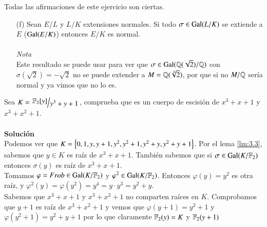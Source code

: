 \begin{ex}[H3.10]
    Todas las afirmaciones de este ejercicio son ciertas.
    \begin{itemize}
        \item[(f)] Sean $E/L$ y $L/K$ extensiones normales. Si todo $\sigma \in \mathrm{Gal}(L/K)$ se extiende a $E$ ($\mathrm{Gal}(E/K)$) entonces $E/K$ es normal.\\\\
        \textit{Nota}\\
        Este resultado se puede usar para ver que $\sigma \in \mathrm{Gal}(\mathbb{Q}(\sqrt 2)/\mathbb{Q})$ con $\sigma(\sqrt 2) = -\sqrt 2$ no se puede extender a $M = \mathbb{Q}(\sqrt[4]{2})$, por que si no $M/\mathbb{Q}$ sería normal y ya vimos que no lo es.
    \end{itemize}
\end{ex}

\begin{ex}[H3.4]
    Sea $K = \quo{\F_2[y]}{y^3 + y + 1}$, comprueba que es un cuerpo de escisión de $x^3 + x + 1$ y $x^3 + x^2 + 1$.\\\\
    \textbf{Solución}\\
    Podemos ver que $K = \left\{0, 1, y, y+1, y^2, y^2+1, y^2+y, y^2+y+1\right\}$. Por el lema \ref{lm:3.3}, sabemos que $y \in K$ es raíz de $x^3+x+1$. También sabemos que si $\sigma \in \mathrm{Gal}(K/\mathbb{F}_2)$ entonces $\sigma(y)$ es raíz de $x^3+x+1$.\\
    Tomamos $\varphi = Frob \in \mathrm{Gal}(K/\mathbb{F}_2)$ y $\varphi^2 \in \mathrm{Gal}(K/\mathbb{F}_2)$. Entonces $\varphi(y) = y^2$ es otra raíz, y $\varphi^2(y) = \varphi(y^2) = y^4 = y \cdot y^3 = y^2+y$.\\
    Sabemos que $x^3+x+1$ y $x^3+x^2+1$ no comparten raíces en $K$. Comprobamos que $y+1$ es raíz de $x^3+x^2+1$ y vemos que $\varphi(y+1)=y^2+1$ y $\varphi(y^2+1) = y^2+y+1$ por lo que claramente $\mathbb{F}_2(y) = K$ y $\mathbb{F}_2(y+1)$
\end{ex}

